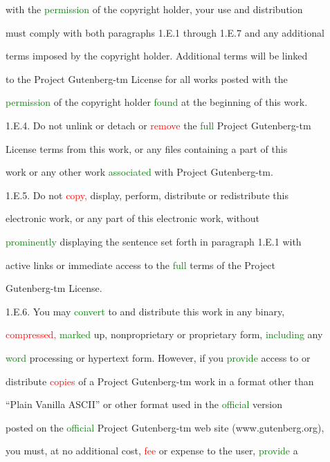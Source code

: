  with the \textcolor{green}{permission} of the copyright holder, your use and distribution

 must comply with both paragraphs 1.E.1 through 1.E.7 and any additional

 terms imposed by the copyright holder. Additional terms will be linked

 to the Project Gutenberg-tm License for all works posted with the

 \textcolor{green}{permission} of the copyright holder \textcolor{green}{found} at the beginning of this work.



 1.E.4. Do not unlink or detach or \textcolor{red}{remove} the \textcolor{green}{full} Project Gutenberg-tm

 License terms from this work, or any files containing a part of this

 work or any other work \textcolor{green}{associated} with Project Gutenberg-tm.



 1.E.5. Do not \textcolor{red}{copy,} display, perform, distribute or redistribute this

 electronic work, or any part of this electronic work, without

 \textcolor{green}{prominently} displaying the \textcolor{BurntOrange}{sentence} set forth in paragraph 1.E.1 with

 active links or immediate access to the \textcolor{green}{full} terms of the Project

 Gutenberg-tm License.



 1.E.6. You may \textcolor{green}{convert} to and distribute this work in any binary,

 \textcolor{red}{compressed,} \textcolor{green}{marked} up, nonproprietary or proprietary form, \textcolor{green}{including} any

 \textcolor{green}{word} processing or hypertext form. However, if you \textcolor{green}{provide} access to or

 distribute \textcolor{red}{copies} of a Project Gutenberg-tm work in a format other than

 “Plain Vanilla ASCII” or other format used in the \textcolor{green}{official} version

 posted on the \textcolor{green}{official} Project Gutenberg-tm web site (www.gutenberg.org),

 you must, at no additional cost, \textcolor{red}{fee} or expense to the user, \textcolor{green}{provide} a

